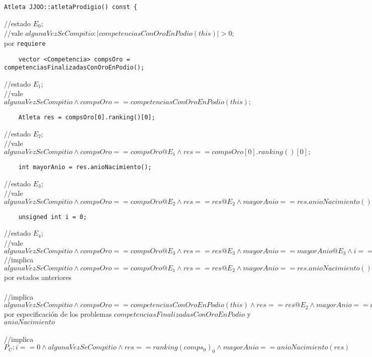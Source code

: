 \documentclass[a4paper]{article}
\newcommand\tab[1][1cm]{\hspace*{#1}}
\begin{document}
\bigskip

\begin{lstlisting}
Atleta JJOO::atletaProdigio() const {
\end{lstlisting}
	//estado $E_{0}$;
	\\
	//vale $algunaVezSeCompitio: |competenciasConOroEnPodio(this)| > 0;$
	\\	
	\tab por \texttt{requiere}
\begin{lstlisting}
	vector <Competencia> compsOro = competenciasFinalizadasConOroEnPodio();
\end{lstlisting}
	//estado $E_{1}$;
	\\
	//vale $algunaVezSeCompitio \land compsOro == competenciasConOroEnPodio(this);$
\begin{lstlisting}
	Atleta res = compsOro[0].ranking()[0];
\end{lstlisting}
	//estado $E_{2}$;
	\\
	//vale $algunaVezSeCompitio \land compsOro == compsOro@E_{1} \land res == compsOro[0].ranking()[0];$
\begin{lstlisting}
	int mayorAnio = res.anioNacimiento();
\end{lstlisting}
	//estado $E_{3}$;
	\\
	//vale $algunaVezSeCompitio \land compsOro == compsOro@E_{2} \land res == res@E_{2} \land mayorAnio == res.anioNacimiento();$
\begin{lstlisting}
	unsigned int i = 0;
\end{lstlisting}
	//estado $E_{4}$;
	\\
	//vale $algunaVezSeCompitio \land compsOro == compsOro@E_{3} \land res == res@E_{3} \land mayorAnio == mayorAnio@E_{3} \land i == 0;$
	\\
	//implica $algunaVezSeCompitio \land compsOro == compsOro@E_{1} \land res == res@E_{2} \land mayorAnio == res.anioNacimiento() \land i == 0;$
	\\
	\tab por estados anteriores
	\\
	\\
	//implica $algunaVezSeCompitio \land compsOro == competenciasConOroEnPodio(this) \land res == res@E_{2} \land mayorAnio == anioNacimiento(res) \land i == 0;$
	\\
	\tab por especificaci\'on de los problemas $competenciasFinalizadasConOroEnPodio$ y $anioNacimiento$
	\\
	\\
	//implica $P_{C}: i==0 \land algunaVezSeCompitio \land res == ranking(comps_{0})_{0} \land mayorAnio == anioNacimiento(res)$
\end{document}
